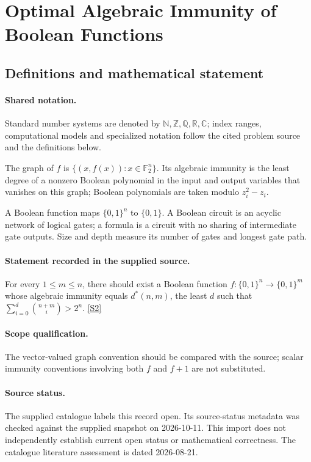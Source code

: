 \documentclass[11pt]{article}
\newcommand{\sref}[2]{\hyperlink{source:#1:#2}{[S#2]}}
\begin{document}
\section{Optimal Algebraic Immunity of Boolean Functions}\label{statement}

\subsection{Definitions and mathematical statement}

\paragraph{Shared notation.}Standard number systems are denoted by $\mathbb N,\mathbb Z,\mathbb Q,\mathbb R,\mathbb C$; index ranges, computational models and specialized notation follow the cited problem source and the definitions below.


The graph of $f$ is $\{(x,f(x)):x\in\mathbb F_2^n\}$. Its algebraic immunity is the least degree of a nonzero Boolean polynomial in the input and output variables that vanishes on this graph; Boolean polynomials are taken modulo $z_i^2-z_i$.

A Boolean function maps $\{0,1\}^n$ to $\{0,1\}$. A Boolean circuit is an acyclic network of logical gates; a formula is a circuit with no sharing of intermediate gate outputs. Size and depth measure its number of gates and longest gate path.
\paragraph{Statement recorded in the supplied source.}
For every $1\leq m\leq n$, there should exist a Boolean function $f:\{0,1\}^n\to\{0,1\}^m$ whose algebraic immunity equals $d^*(n,m)$, the least $d$ such that $\sum_{i=0}^d\binom{n+m}{i}>2^n$. \sref{statement}{2}
\paragraph{Scope qualification.}
The vector-valued graph convention should be compared with the source; scalar immunity conventions involving both $f$ and $f+1$ are not substituted.
\paragraph{Source status.}
The supplied catalogue labels this record open. Its source-status metadata was checked against the supplied snapshot on 2026-10-11. This import does not independently establish current open status or mathematical correctness. The catalogue literature assessment is dated 2026-08-21.
\end{document}
